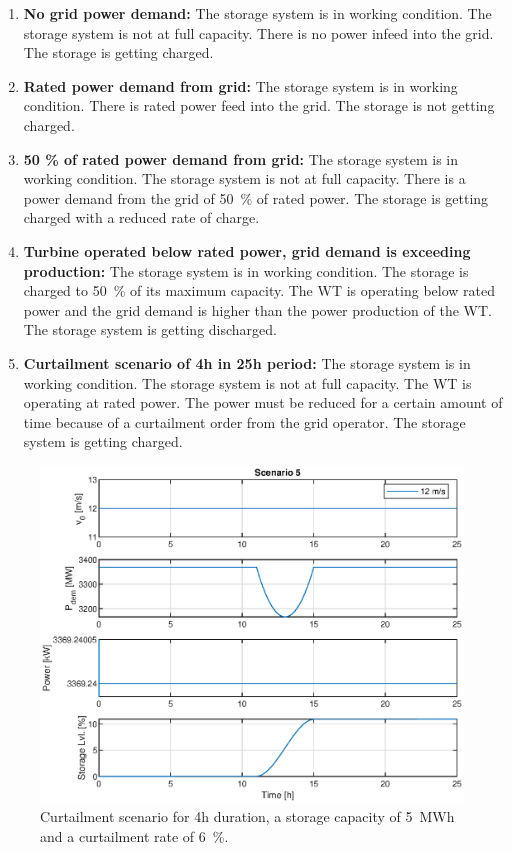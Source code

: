 \begin{enumerate}
	\item \textbf{No grid power demand:}
	The storage system is in working condition.
	The storage system is not at full capacity.
	There is no power infeed into the grid.
	The storage is getting charged.
	
	\item \textbf{Rated power demand from grid:}
	The storage system is in working condition.
	There is rated power feed into the grid.
	The storage is not getting charged.
	
	\item \textbf{50 \% of rated power demand from grid:}
	The storage system is in working condition.
	The storage system is not at full capacity.
	There is a power demand from the grid of \SI{50}{\%} of rated power.
	The storage is getting charged with a reduced rate of charge.
	
	\item \textbf{Turbine operated below rated power, grid demand is exceeding production:}
	The storage system is in working condition.
	The storage is charged to \SI{50}{\%} of its maximum capacity.
	The \gls{WT} is operating below rated power and the grid demand is higher than the power production of the \gls{WT}.
	The storage system is getting discharged.
	
	\item \textbf{Curtailment scenario of 4h in 25h period:}
	The storage system is in working condition.
	The storage system is not at full capacity.
	The WT is operating at rated power.
	The power must be reduced for a certain amount of time because of a curtailment order from the grid operator.
	The storage system is getting charged.
\end{enumerate}

\begin{figure}[h]
	\centering	
	\includegraphics[width=12cm]{Figures/StorageDummyCurtailmentScenario.eps}
	\caption{Curtailment scenario for 4h duration, a storage capacity of \SI{5}{MWh} and a curtailment rate of \SI{6}{\%}.}
	\label{fig:curtailment scenario}
\end{figure} 
